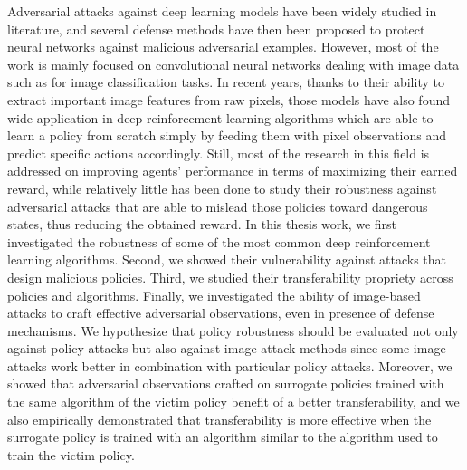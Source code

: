 \begin{abstract*}
  Adversarial attacks against deep learning models have been widely studied in literature, and several defense methods have then been proposed to protect neural networks against malicious adversarial examples. However, most of the work is mainly focused on convolutional neural networks dealing with image data such as for image classification tasks. In recent years, thanks to their ability to extract important image features from raw pixels, those models have also found wide application in deep reinforcement learning algorithms which are able to learn a policy from scratch simply by feeding them with pixel observations and predict specific actions accordingly. Still, most of the research in this field is addressed on improving agents' performance in terms of maximizing their earned reward, while relatively little has been done to study their robustness against adversarial attacks that are able to mislead those policies toward dangerous states, thus reducing the obtained reward. In this thesis work, we first investigated the robustness of some of the most common deep reinforcement learning algorithms. Second, we showed their vulnerability against attacks that design malicious policies. Third, we studied their transferability propriety across policies and algorithms. Finally, we investigated the ability of image-based attacks to craft effective adversarial observations, even in presence of defense mechanisms. We hypothesize that policy robustness should be evaluated not only against policy attacks but also against image attack methods since some image attacks work better in combination with particular policy attacks. Moreover, we showed that adversarial observations crafted on surrogate policies trained with the same algorithm of the victim policy benefit of a better transferability, and we also empirically demonstrated that transferability is more effective when the surrogate policy is trained with an algorithm similar to the algorithm used to train the victim policy.


\end{abstract*}

